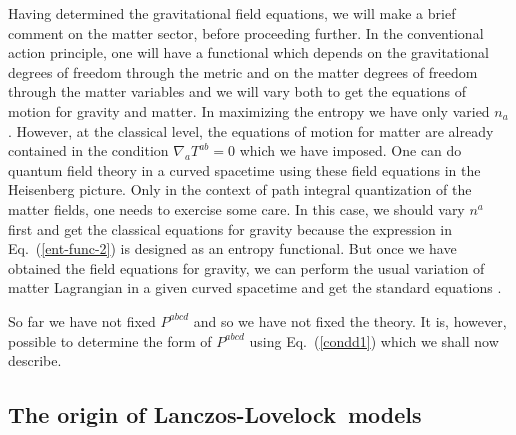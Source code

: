\documentclass[12pt]{iopart}
\def\eq#1{{Eq.~(\ref{#1})}}
\newcommand{\LL}{Lanczos-Lovelock}
\begin{document}
Having determined the gravitational field equations, we will make a brief comment on the matter sector, before proceeding further. 
 In the conventional action principle, one will have a functional which depends on the gravitational degrees of freedom through the metric and on the matter degrees of freedom through the matter variables and we will vary both to get the equations of motion for gravity and matter. In maximizing the entropy we have only varied $n_a$.
 However,
 at the classical level, the  equations of motion for matter are already contained in the condition $\nabla_a T^{ab} =0$ which we have  imposed.  One can do quantum field theory in a curved spacetime  using these field equations in the Heisenberg picture. 
 Only in the context of   path integral quantization of the matter fields, one needs
 to exercise some care. In this case, we should  vary $n^a$ first  and get the classical equations for gravity
 because the expression in \eq{ent-func-2} is designed as an entropy functional.  
 But once we have obtained 
 the field equations for gravity, we can perform the usual variation of matter Lagrangian in a given curved spacetime and get the standard equations \cite{aseementropy}. 
 
 
So far we have not fixed $P^{abcd}$ and so we have not fixed the theory. 
It is, however, possible to determine the form of $P^{abcd}$ using \eq{condd1}
which we shall now describe.

\subsection{The origin of \LL\ models}\label{sec:originofll}
\end{document}
